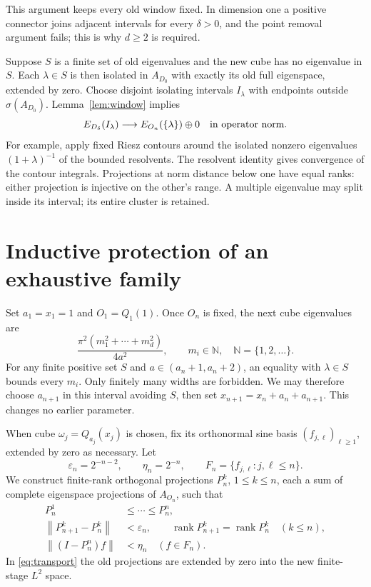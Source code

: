 \documentclass[11pt]{article}
\newcommand{\N}{\mathbb N}
\newcommand{\rank}{\operatorname{rank}}
\newcommand{\norm}[1]{\left\lVert #1\right\rVert}
\begin{document}
This argument keeps every old window fixed. In dimension one a positive
connector joins adjacent intervals for every $\delta>0$, and the point
removal argument fails; this is why $d\ge2$ is required.

Suppose $S$ is a finite set of old eigenvalues and the new cube has no
eigenvalue in $S$. Each $\lambda\in S$ is then isolated in $A_{D_0}$ with
exactly its old full eigenspace, extended by zero.
Choose disjoint isolating intervals $I_\lambda$ with endpoints outside
$\sigma(A_{D_0})$. Lemma~\ref{lem:window} implies
\begin{equation}\label{eq:clusters}
 E_{D_\delta}(I_\lambda)
   \longrightarrow E_{O_n}(\{\lambda\})\oplus0
 \quad\hbox{in operator norm}.
\end{equation}
For example, apply fixed Riesz contours around the isolated nonzero
eigenvalues $(1+\lambda)^{-1}$ of the bounded resolvents.
The resolvent identity gives convergence of the contour integrals.
Projections at norm distance below one have equal ranks: either
projection is injective on the other's range. A multiple eigenvalue may
split inside its interval; its entire cluster is retained.

\section{Inductive protection of an exhaustive family}

Set $a_1=x_1=1$ and $O_1=Q_1(1)$.
Once $O_n$ is fixed, the next cube eigenvalues are
\[
 \frac{\pi^2(m_1^2+\cdots+m_d^2)}{4a^2},
 \qquad m_i\in\N,\quad \N=\{1,2,\ldots\}.
\]
For any finite positive set $S$ and $a\in(a_n+1,a_n+2)$, an equality with
$\lambda\in S$ bounds every $m_i$. Only finitely many widths are forbidden.
We may therefore choose $a_{n+1}$ in this interval avoiding $S$, then
set $x_{n+1}=x_n+a_n+a_{n+1}$. This changes no earlier parameter.

When cube $\omega_j=Q_{a_j}(x_j)$ is chosen, fix its orthonormal sine
basis $(f_{j,\ell})_{\ell\ge1}$, extended by zero as necessary.
Let
\[
 \varepsilon_n=2^{-n-2},\qquad \eta_n=2^{-n},\qquad
 F_n=\{f_{j,\ell}:j,\ell\le n\}.
\]
We construct finite-rank orthogonal projections $P_n^k$, $1\le k\le n$,
each a sum of complete eigenspace projections of $A_{O_n}$, such that
\begin{align}
 P_n^1&\le\cdots\le P_n^n,\label{eq:nesting}\\
 \norm{P_{n+1}^k-P_n^k}&<\varepsilon_n,\qquad
 \rank P_{n+1}^k=\rank P_n^k \quad(k\le n),\label{eq:transport}\\
 \norm{(I-P_n^n)f}&<\eta_n\quad(f\in F_n).\label{eq:birth}
\end{align}
In \eqref{eq:transport} the old projections are extended by zero into the
new finite-stage $L^2$ space.
\end{document}
